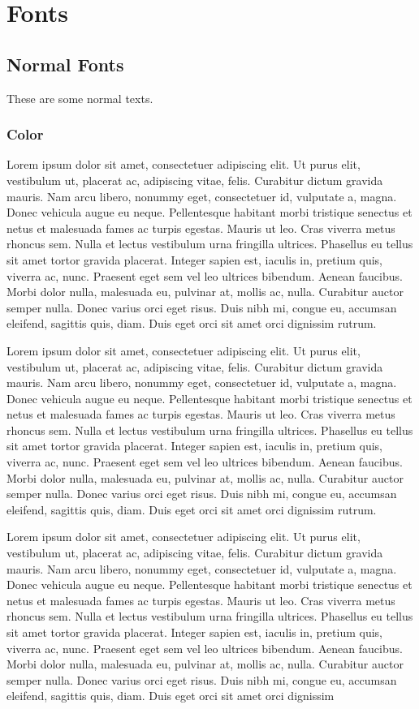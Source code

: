\documentclass{article}
\begin{document}
\section{Fonts}

\subsection{Normal Fonts}
These are some normal texts.
\subsubsection{Color}
\color{cyan}Lorem ipsum dolor sit amet, consectetuer adipiscing elit. Ut purus elit, vestibulum ut, placerat ac, adipiscing vitae, felis. Curabitur dictum gravida mauris. Nam arcu libero, nonummy eget, consectetuer id, vulputate a, magna. Donec vehicula augue eu neque. Pellentesque habitant morbi tristique senectus et netus et malesuada fames ac turpis egestas. Mauris ut leo. Cras viverra metus rhoncus sem. Nulla et lectus vestibulum urna fringilla ultrices. Phasellus eu tellus sit amet tortor gravida placerat. Integer sapien est, iaculis in, pretium quis, viverra ac, nunc. Praesent eget sem vel leo ultrices bibendum. Aenean faucibus. Morbi dolor nulla, malesuada eu, pulvinar at, mollis ac, nulla. Curabitur auctor semper nulla. Donec varius orci eget risus. Duis nibh mi, congue eu, accumsan eleifend, sagittis quis, diam. Duis eget orci sit amet orci dignissim
rutrum.\par
\color{magenta} Lorem ipsum dolor sit amet, consectetuer adipiscing elit. Ut purus elit, vestibulum ut, placerat ac, adipiscing vitae, felis. Curabitur dictum gravida mauris. Nam arcu libero, nonummy eget, consectetuer id, vulputate a, magna. Donec vehicula augue eu neque. Pellentesque habitant morbi tristique senectus et netus et malesuada fames ac turpis egestas. Mauris ut leo. Cras viverra metus rhoncus sem. Nulla et lectus vestibulum urna fringilla ultrices. Phasellus eu tellus sit amet tortor gravida placerat. Integer sapien est, iaculis in, pretium quis, viverra ac, nunc. Praesent eget sem vel leo ultrices bibendum. Aenean faucibus. Morbi dolor nulla, malesuada eu, pulvinar at, mollis ac, nulla. Curabitur auctor semper nulla. Donec varius orci eget risus. Duis nibh mi, congue eu, accumsan eleifend, sagittis quis, diam. Duis eget orci sit amet orci dignissim
rutrum. \par
\color{black} Lorem ipsum dolor sit amet, consectetuer adipiscing elit. Ut purus elit, vestibulum ut, placerat ac, adipiscing vitae, felis. Curabitur dictum gravida mauris. Nam arcu libero, nonummy eget, consectetuer id, vulputate a, magna. Donec vehicula augue eu neque. Pellentesque habitant morbi tristique senectus et netus et malesuada fames ac turpis egestas. Mauris ut leo. Cras viverra metus rhoncus sem. Nulla et lectus vestibulum urna fringilla ultrices. Phasellus eu tellus sit amet tortor gravida placerat. Integer sapien est, iaculis in, pretium quis, viverra ac, nunc. Praesent eget sem vel leo ultrices bibendum. Aenean faucibus. Morbi dolor nulla, malesuada eu, pulvinar at, mollis ac, nulla. Curabitur auctor semper nulla. Donec varius orci eget risus. Duis nibh mi, congue eu, accumsan eleifend, sagittis quis, diam. Duis eget orci sit amet orci dignissim
\end{document}
